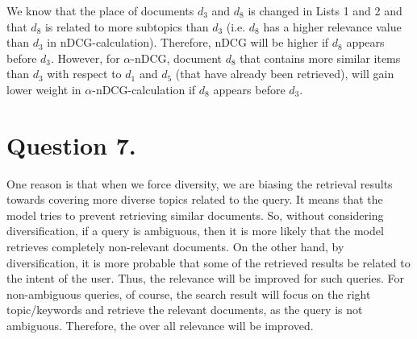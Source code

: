 \documentclass[11pt]{article}
\begin{document}
We know that the place of documents $d_3$ and $d_8$ is changed in Lists 1 and 2 and that $d_8$ is related to more subtopics than $d_3$ (i.e. $d_8$ has a higher relevance value than $d_3$ in $\text{nDCG}$-calculation). Therefore, $\text{nDCG}$ will be higher if $d_8$ appears before $d_3$. However, for $\alpha\text{-nDCG}$, document $d_8$ that contains more similar items than $d_3$ with respect to $d_1$ and $d_5$ (that have already been retrieved), will gain lower weight in $\alpha\text{-nDCG}$-calculation if $d_8$ appears before $d_3$. 

\section*{Question 7.}%

One reason is that when we force diversity, we are biasing the retrieval results towards  covering more diverse topics related to the query. It means that the model tries to prevent retrieving similar documents. So, without considering diversification, if a query is ambiguous, then it is more likely that the model retrieves completely non-relevant documents. On the other hand, by diversification, it is more probable that some of the retrieved results be related to the intent of the user. Thus, the relevance will be improved for such queries. 
For non-ambiguous queries, of course, the search result will focus on the right topic/keywords and retrieve the relevant documents, as the query is not ambiguous. Therefore, the over all relevance will be improved. 

\end{document}
